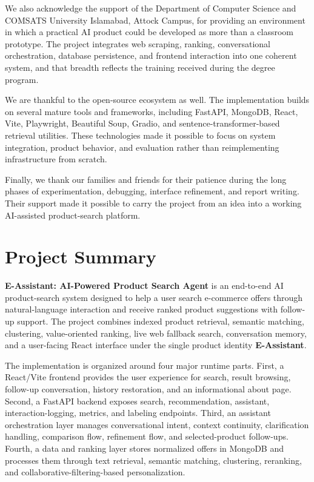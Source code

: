 \documentclass[12pt,a4paper,oneside]{report}
\newcommand{\projecttitle}{E-Assistant: AI-Powered Product Search Agent}
\begin{document}
We also acknowledge the support of the Department of Computer Science and COMSATS University Islamabad, Attock Campus, for providing an environment in which a practical AI product could be developed as more than a classroom prototype. The project integrates web scraping, ranking, conversational orchestration, database persistence, and frontend interaction into one coherent system, and that breadth reflects the training received during the degree program.

We are thankful to the open-source ecosystem as well. The implementation builds on several mature tools and frameworks, including FastAPI, MongoDB, React, Vite, Playwright, Beautiful Soup, Gradio, and sentence-transformer-based retrieval utilities. These technologies made it possible to focus on system integration, product behavior, and evaluation rather than reimplementing infrastructure from scratch.

Finally, we thank our families and friends for their patience during the long phases of experimentation, debugging, interface refinement, and report writing. Their support made it possible to carry the project from an idea into a working AI-assisted product-search platform.

\chapter*{Project Summary}
\textbf{\projecttitle} is an end-to-end AI product-search system designed to help a user search e-commerce offers through natural-language interaction and receive ranked product suggestions with follow-up support. The project combines indexed product retrieval, semantic matching, clustering, value-oriented ranking, live web fallback search, conversation memory, and a user-facing React interface under the single product identity \textbf{E-Assistant}.

The implementation is organized around four major runtime parts. First, a React/Vite frontend provides the user experience for search, result browsing, follow-up conversation, history restoration, and an informational about page. Second, a FastAPI backend exposes search, recommendation, assistant, interaction-logging, metrics, and labeling endpoints. Third, an assistant orchestration layer manages conversational intent, context continuity, clarification handling, comparison flow, refinement flow, and selected-product follow-ups. Fourth, a data and ranking layer stores normalized offers in MongoDB and processes them through text retrieval, semantic matching, clustering, reranking, and collaborative-filtering-based personalization.
\end{document}
